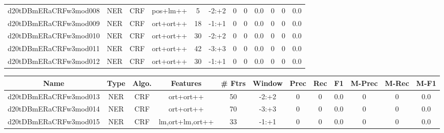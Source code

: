 \documentclass[a4paper]{article}
\begin{document}
\begin{landscape}
\begin{center}
\begin{tabular}{ |c|c|c|c|c|c|c|c|c|c|c|c|}
 
 	
 	\small{ d20tDBmERaCRFw3mod008 } & \small{ NER} & \small{  CRF }  & pos+lm++  &  5 &  \small{  -2:+2 }  &  0 & 0 & 0.0  &  0 & 0 & 0.0 \\
 	

 
 	
 	\small{ d20tDBmERaCRFw3mod009 } & \small{ NER} & \small{  CRF }  & ort+ort++  &  18 &  \small{  -1:+1 }  &  0 & 0 & 0.0  &  0 & 0 & 0.0 \\
 	

 
 	
 	\small{ d20tDBmERaCRFw3mod010 } & \small{ NER} & \small{  CRF }  & ort+ort++  &  30 &  \small{  -2:+2 }  &  0 & 0 & 0.0  &  0 & 0 & 0.0 \\
 	

 
 	
 	\small{ d20tDBmERaCRFw3mod011 } & \small{ NER} & \small{  CRF }  & ort+ort++  &  42 &  \small{  -3:+3 }  &  0 & 0 & 0.0  &  0 & 0 & 0.0 \\
 	

 
 	
 	\small{ d20tDBmERaCRFw3mod012 } & \small{ NER} & \small{  CRF }  & ort+ort++  &  30 &  \small{  -1:+1 }  &  0 & 0 & 0.0  &  0 & 0 & 0.0 \\
 	
 \hline
\end{tabular}
\end{center}




\begin{center}
\begin{tabular}{ |c|c|c|c|c|c|c|c|c|c|c|c|} 
 \hline
 	Name & Type & Algo. & Features & \# Ftrs & Window & Prec & Rec & F1 & M-Prec & M-Rec & M-F1\\
 \hline

 	

 
 	
 	\small{ d20tDBmERaCRFw3mod013 } & \small{ NER} & \small{  CRF }  & ort+ort++  &  50 &  \small{  -2:+2 }  &  0 & 0 & 0.0  &  0 & 0 & 0.0 \\
 	

 
 	
 	\small{ d20tDBmERaCRFw3mod014 } & \small{ NER} & \small{  CRF }  & ort+ort++  &  70 &  \small{  -3:+3 }  &  0 & 0 & 0.0  &  0 & 0 & 0.0 \\
 	

 
 	
 	\small{ d20tDBmERaCRFw3mod015 } & \small{ NER} & \small{  CRF }  & lm,ort+lm,ort++  &  33 &  \small{  -1:+1 }  &  0 & 0 & 0.0  &  0 & 0 & 0.0 \\
 	


\end{tabular}
\end{center}
\end{landscape}
\end{document}
